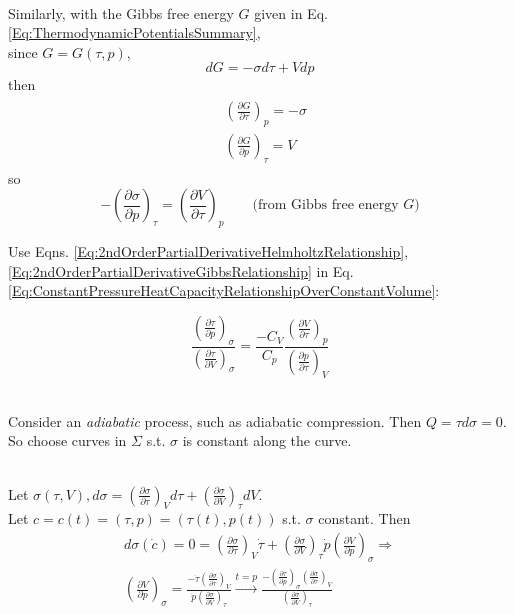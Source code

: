 \documentclass[10pt]{amsart}
\begin{document}
\begin{multicols*}{2}
\quad \\ 
Similarly, with the Gibbs free energy $G$ given in Eq. \ref{Eq:ThermodynamicPotentialsSummary}, \\
since $G=G(\tau, p)$, 
\[
dG = -\sigma d\tau + Vdp
\]
then 
\[
\begin{gathered}
	\begin{aligned}
		& \left( \frac{\partial G}{\partial \tau} \right)_p = -\sigma \\ 
		& \left( \frac{ \partial G}{\partial p} \right)_{\tau} = V
	\end{aligned} 
\end{gathered}
\]
so 
\begin{equation}\label{Eq:2ndOrderPartialDerivativeGibbsRelationship}
-\left( \frac{ \partial \sigma}{ \partial p} \right)_{\tau} = \left(\frac{\partial V}{\partial \tau } \right)_p \qquad \text{(from Gibbs free energy $G$)}
\end{equation}

Use Eqns. \ref{Eq:2ndOrderPartialDerivativeHelmholtzRelationship}, \ref{Eq:2ndOrderPartialDerivativeGibbsRelationship} in Eq. \ref{Eq:ConstantPressureHeatCapacityRelationshipOverConstantVolume}:

\begin{equation}\label{Eq:ConstantPressureHeatCapacityRelationshipOverConstantVolume2}
\frac{ \left( \frac{\partial \tau}{\partial p}\right)_{\sigma} }{ \left( \frac{\partial \tau}{\partial V}\right)_{\sigma} } = \frac{-C_V}{C_p} \frac{ \left( \frac{\partial V}{\partial \tau}\right)_p }{ \left( \frac{\partial p}{\partial \tau}\right)_V } 
\end{equation}

\quad \\ 
Consider an \emph{adiabatic} process, such as adiabatic compression. Then $Q = \tau d\sigma = 0$. So choose curves in $\Sigma$ s.t. $\sigma$ is constant along the curve.

\quad \\
Let $\sigma(\tau, V), d\sigma = \left( \frac{\partial \sigma}{\partial \tau} \right)_V d\tau + \left( \frac{\partial \sigma}{\partial V} \right)_{\tau} dV$. \\
Let $c=c(t)= (\tau, p) = (\tau(t), p(t))$ s.t. $\sigma$ constant. Then
\begin{equation}\label{Eq:AdiabaticDifferentialRelationship1}
\begin{gathered}
d\sigma(\dot{c}) = 0 = \left( \frac{\partial \sigma}{\partial \tau} \right)_V \dot{\tau} + \left( \frac{\partial \sigma}{\partial V} \right)_{\tau} \dot{p} \left( \frac{\partial V}{ \partial p } \right)_{\sigma} \Longrightarrow \\
\left( \frac{\partial V}{\partial p} \right)_{\sigma} = \frac{ - \dot{\tau} \left( \frac{\partial \sigma}{\partial \tau} \right)_V }{ \dot{p} \left( \frac{\partial \sigma}{\partial V} \right)_{\tau} }\xrightarrow{t = p} \frac{ - \left( \frac{\partial \tau}{\partial p} \right)_{\sigma} \left( \frac{\partial \sigma}{\partial \tau}\right)_V }{ \left( \frac{\partial \sigma}{\partial V}\right)_{\tau} } 
\end{gathered}
\end{equation}
 

\end{multicols*}
\end{document}
